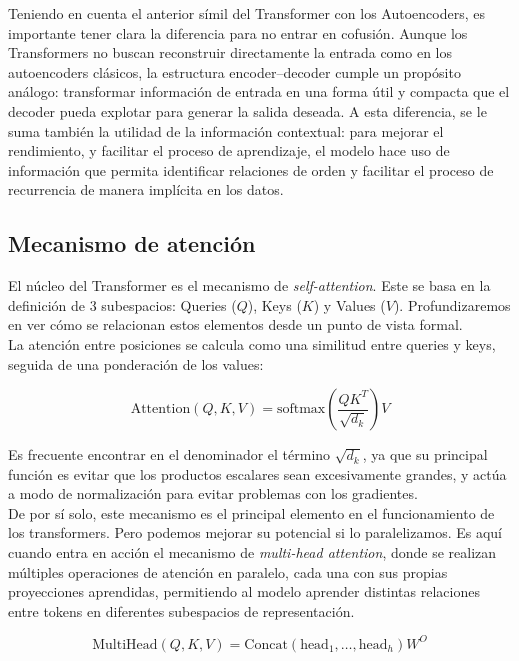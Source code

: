 Teniendo en cuenta el anterior símil del Transformer con los Autoencoders, es importante tener clara la diferencia para no entrar en cofusión. Aunque los Transformers no buscan reconstruir directamente la entrada como en los autoencoders clásicos, la estructura encoder–decoder cumple un propósito análogo: transformar información de entrada en una forma útil y compacta que el decoder pueda explotar para generar la salida deseada. A esta diferencia, se le suma también la utilidad de la información contextual: para mejorar el rendimiento, y facilitar el proceso de aprendizaje, el modelo hace uso de información que permita identificar relaciones de orden y facilitar el proceso de recurrencia de manera implícita en los datos.

\subsection{Mecanismo de atención}

El núcleo del Transformer es el mecanismo de \textit{self-attention}. Este se basa en la definición de 3 subespacios: Queries ($Q$), Keys ($K$) y Values ($V$). Profundizaremos en ver cómo se relacionan estos elementos desde un punto de vista formal.\\

La atención entre posiciones se calcula como una similitud entre queries y keys, seguida de una ponderación de los values:

\begin{equation}
    \text{Attention}(Q, K, V) = \text{softmax} \left( \frac{QK^T}{\sqrt{d_k}} \right)V
\end{equation}

Es frecuente encontrar en el denominador el término $\sqrt{d_k}$, ya que su principal función es evitar que los productos escalares sean excesivamente grandes, y actúa a modo de normalización para evitar problemas con los gradientes.\\

De por sí solo, este mecanismo es el principal elemento en el funcionamiento de los transformers. Pero podemos mejorar su potencial si lo paralelizamos. Es aquí cuando entra en acción el mecanismo de \textit{multi-head attention}, donde se realizan múltiples operaciones de atención en paralelo, cada una con sus propias proyecciones aprendidas, permitiendo al modelo aprender distintas relaciones entre tokens en diferentes subespacios de representación.

\begin{equation}
    \text{MultiHead}(Q, K, V) = \text{Concat}(\text{head}_1, \ldots, \text{head}_h)W^O
\end{equation}

